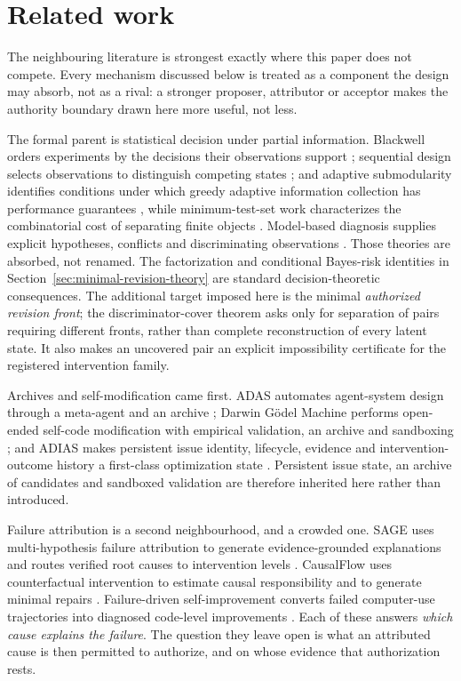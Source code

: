 \section{Related work}
\label{sec:related}

The neighbouring literature is strongest exactly where this paper does not compete. Every mechanism discussed below is treated as a component the design may absorb, not as a rival: a stronger proposer, attributor or acceptor makes the authority boundary drawn here more useful, not less.

The formal parent is statistical decision under partial information. Blackwell
orders experiments by the decisions their observations support
\cite{blackwell1953}; sequential design selects observations to distinguish
competing states \cite{chernoff1959}; and adaptive submodularity identifies
conditions under which greedy adaptive information collection has performance
guarantees \cite{golovin2011}, while minimum-test-set work characterizes the
combinatorial cost of separating finite objects \cite{moret1985}. Model-based diagnosis supplies explicit
hypotheses, conflicts and discriminating observations
\cite{reiter1987,dekleer1987}. Those theories are absorbed, not renamed. The
factorization and conditional Bayes-risk identities in
Section~\ref{sec:minimal-revision-theory} are standard decision-theoretic
consequences. The additional target imposed here is the minimal
\emph{authorized revision front}; the discriminator-cover theorem asks only
for separation of pairs requiring different fronts, rather than complete
reconstruction of every latent state. It also makes an uncovered pair an
explicit impossibility certificate for the registered intervention family.

Archives and self-modification came first. ADAS automates agent-system design through a meta-agent and an archive \cite{adas2024}; Darwin G\"odel Machine performs open-ended self-code modification with empirical validation, an archive and sandboxing \cite{dgm2025}; and ADIAS makes persistent issue identity, lifecycle, evidence and intervention-outcome history a first-class optimization state \cite{adias2026}. Persistent issue state, an archive of candidates and sandboxed validation are therefore inherited here rather than introduced.

Failure attribution is a second neighbourhood, and a crowded one. SAGE uses multi-hypothesis failure attribution to generate evidence-grounded explanations and routes verified root causes to intervention levels \cite{sagemhfa2026}. CausalFlow uses counterfactual intervention to estimate causal responsibility and to generate minimal repairs \cite{causalflow2026}. Failure-driven self-improvement converts failed computer-use trajectories into diagnosed code-level improvements \cite{failurelearning2026}. Each of these answers \emph{which cause explains the failure}. The question they leave open is what an attributed cause is then permitted to authorize, and on whose evidence that authorization rests.

